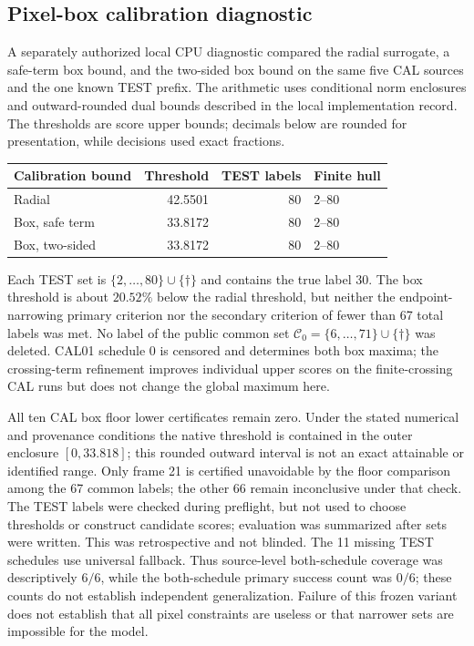 \documentclass[11pt]{article}
\theoremstyle{noteplain}
\newcommand{\dates}[2]{\{#1,\ldots,#2\}}
\newcommand{\dd}{\dagger}
\begin{document}
\subsection{Pixel-box calibration diagnostic}\label{sec:boxreplay}
A separately authorized local CPU diagnostic compared the radial surrogate, a safe-term box bound, and the two-sided box bound on the same five CAL sources and the one known TEST prefix. The arithmetic uses conditional norm enclosures and outward-rounded dual bounds described in the local implementation record. The thresholds are score upper bounds; decimals below are rounded for presentation, while decisions used exact fractions.
\begin{center}
\small
\begin{tabular}{lrrl}
\toprule
Calibration bound & Threshold & TEST labels & Finite hull \\
\midrule
Radial & 42.5501 & 80 & $2$--$80$ \\
Box, safe term & 33.8172 & 80 & $2$--$80$ \\
Box, two-sided & 33.8172 & 80 & $2$--$80$ \\
\bottomrule
\end{tabular}
\end{center}
Each TEST set is $\dates{2}{80}\cup\{\dd\}$ and contains the true label 30. The box threshold is about $20.52\%$ below the radial threshold, but neither the endpoint-narrowing primary criterion nor the secondary criterion of fewer than 67 total labels was met. No label of the public common set $\mathcal C_0=\dates{6}{71}\cup\{\dd\}$ was deleted. CAL01 schedule 0 is censored and determines both box maxima; the crossing-term refinement improves individual upper scores on the finite-crossing CAL runs but does not change the global maximum here.

All ten CAL box floor lower certificates remain zero. Under the stated numerical and provenance conditions the native threshold is contained in the outer enclosure $[0,33.818]$; this rounded outward interval is not an exact attainable or identified range. Only frame 21 is certified unavoidable by the floor comparison among the 67 common labels; the other 66 remain inconclusive under that check. The TEST labels were checked during preflight, but not used to choose thresholds or construct candidate scores; evaluation was summarized after sets were written. This was retrospective and not blinded. The 11 missing TEST schedules use universal fallback. Thus source-level both-schedule coverage was descriptively $6/6$, while the both-schedule primary success count was $0/6$; these counts do not establish independent generalization. Failure of this frozen variant does not establish that all pixel constraints are useless or that narrower sets are impossible for the model.
\end{document}

